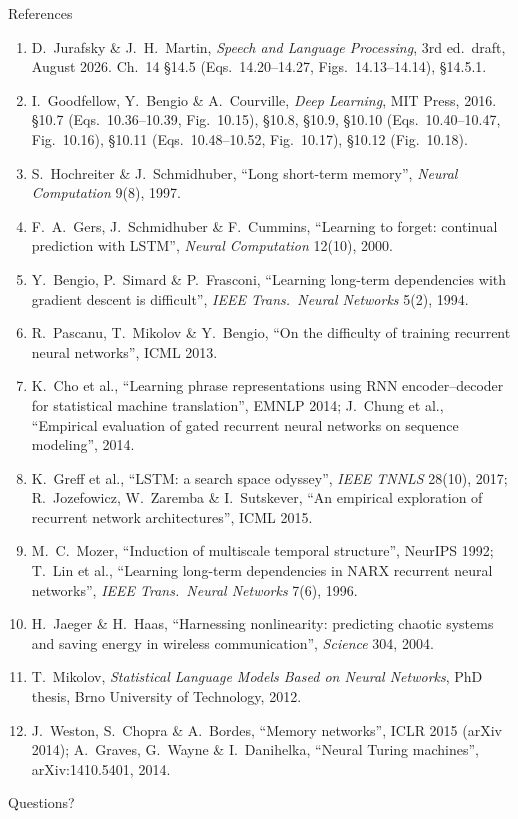 \documentclass[aspectratio=169, 11pt]{beamer}
\newcommand{\nosrc}{}       %
\begin{document}
\begin{frame}[allowframebreaks]{References}
  \nosrc
  \vspace{0.3em}
  {\scriptsize
  \begin{enumerate}\itemsep0.30em
    \item D.\ Jurafsky \& J.\ H.\ Martin, \emph{Speech and Language
          Processing}, 3rd ed.\ draft, August 2026. Ch.~14 \S14.5
          (Eqs.~14.20--14.27, Figs.~14.13--14.14), \S14.5.1.
    \item I.\ Goodfellow, Y.\ Bengio \& A.\ Courville, \emph{Deep
          Learning}, MIT Press, 2016. \S10.7 (Eqs.~10.36--10.39,
          Fig.~10.15), \S10.8, \S10.9, \S10.10 (Eqs.~10.40--10.47,
          Fig.~10.16), \S10.11 (Eqs.~10.48--10.52, Fig.~10.17),
          \S10.12 (Fig.~10.18).
    \item S.\ Hochreiter \& J.\ Schmidhuber, ``Long short-term memory'',
          \emph{Neural Computation} 9(8), 1997.
    \item F.\ A.\ Gers, J.\ Schmidhuber \& F.\ Cummins, ``Learning to
          forget: continual prediction with LSTM'', \emph{Neural
          Computation} 12(10), 2000.
    \item Y.\ Bengio, P.\ Simard \& P.\ Frasconi, ``Learning long-term
          dependencies with gradient descent is difficult'', \emph{IEEE
          Trans.\ Neural Networks} 5(2), 1994.
    \item R.\ Pascanu, T.\ Mikolov \& Y.\ Bengio, ``On the difficulty of
          training recurrent neural networks'', ICML 2013.
    \item K.\ Cho et al., ``Learning phrase representations using RNN
          encoder--decoder for statistical machine translation'',
          EMNLP 2014; J.\ Chung et al., ``Empirical evaluation of gated
          recurrent neural networks on sequence modeling'', 2014.
    \item K.\ Greff et al., ``LSTM: a search space odyssey'', \emph{IEEE
          TNNLS} 28(10), 2017; R.\ Jozefowicz, W.\ Zaremba \&
          I.\ Sutskever, ``An empirical exploration of recurrent network
          architectures'', ICML 2015.
    \item M.\ C.\ Mozer, ``Induction of multiscale temporal structure'',
          NeurIPS 1992; T.\ Lin et al., ``Learning long-term dependencies
          in NARX recurrent neural networks'', \emph{IEEE Trans.\ Neural
          Networks} 7(6), 1996.
    \item H.\ Jaeger \& H.\ Haas, ``Harnessing nonlinearity: predicting
          chaotic systems and saving energy in wireless communication'',
          \emph{Science} 304, 2004.
    \item T.\ Mikolov, \emph{Statistical Language Models Based on Neural
          Networks}, PhD thesis, Brno University of Technology, 2012.
    \item J.\ Weston, S.\ Chopra \& A.\ Bordes, ``Memory networks'',
          ICLR 2015 (arXiv 2014); A.\ Graves, G.\ Wayne \& I.\ Danihelka,
          ``Neural Turing machines'', arXiv:1410.5401, 2014.
  \end{enumerate}}
\end{frame}

\begin{frame}[standout]
  \nosrc
  Questions?
\end{frame}
\end{document}
